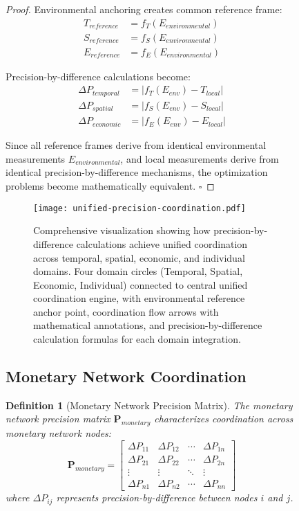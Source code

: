 \documentclass[12pt,a4paper]{article}
\newtheorem{definition}[theorem]{Definition}
\begin{document}
\begin{figure}[H]
\begin{proof}
Environmental anchoring creates common reference frame:
\begin{align}
T_{reference} &= f_T(E_{environmental}) \\
S_{reference} &= f_S(E_{environmental}) \\
E_{reference} &= f_E(E_{environmental})
\end{align}

Precision-by-difference calculations become:
\begin{align}
\Delta P_{temporal} &= |f_T(E_{env}) - T_{local}| \\
\Delta P_{spatial} &= |f_S(E_{env}) - S_{local}| \\
\Delta P_{economic} &= |f_E(E_{env}) - E_{local}|
\end{align}

Since all reference frames derive from identical environmental measurements $E_{environmental}$, and local measurements derive from identical precision-by-difference mechanisms, the optimization problems become mathematically equivalent. $\square$
\end{proof}

\begin{figure}[H]
\centering
\texttt{[image: unified-precision-coordination.pdf]}
\caption{Comprehensive visualization showing how precision-by-difference calculations achieve unified coordination across temporal, spatial, economic, and individual domains. Four domain circles (Temporal, Spatial, Economic, Individual) connected to central unified coordination engine, with environmental reference anchor point, coordination flow arrows with mathematical annotations, and precision-by-difference calculation formulas for each domain integration.}
\label{fig:unified_coordination}
\end{figure}

\subsection{Monetary Network Coordination}

\begin{definition}[Monetary Network Precision Matrix]
The monetary network precision matrix $\mathbf{P}_{monetary}$ characterizes coordination across monetary network nodes:
\begin{equation}
\mathbf{P}_{monetary} = \begin{bmatrix}
\Delta P_{11} & \Delta P_{12} & \cdots & \Delta P_{1n} \\
\Delta P_{21} & \Delta P_{22} & \cdots & \Delta P_{2n} \\
\vdots & \vdots & \ddots & \vdots \\
\Delta P_{n1} & \Delta P_{n2} & \cdots & \Delta P_{nn}
\end{bmatrix}
\end{equation}
where $\Delta P_{ij}$ represents precision-by-difference between nodes $i$ and $j$.
\end{definition}


\end{figure}
\end{document}
